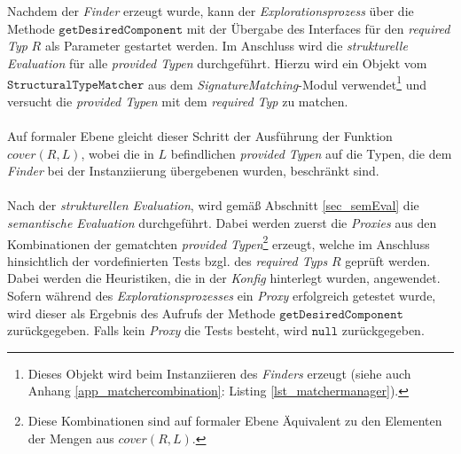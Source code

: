 \\\\
Nachdem der \emph{Finder} erzeugt wurde, kann der \emph{Explorationsprozess} über die Methode \linebreak$\texttt{getDesiredComponent}$ mit der Übergabe des \Gls{Interface}s für den \emph{required Typ} $R$ als Parameter gestartet werden. Im Anschluss wird die \emph{strukturelle Evaluation} für alle \emph{provided Typen}  durchgeführt. Hierzu wird ein Objekt vom $\texttt{StructuralTypeMatcher}$ aus dem \emph{SignatureMatching}-\Gls{Modul} verwendet\footnote{Dieses Objekt wird beim Instanziieren des \emph{Finders} erzeugt (siehe auch Anhang \ref{app_matchercombination}: Listing \ref{lst_matchermanager}).} und versucht die \emph{provided Typen} mit dem \emph{required Typ} zu matchen.
\\\\
Auf formaler Ebene gleicht dieser Schritt der Ausführung der Funktion $\mathit{cover(R,L)}$, wobei die in $L$ befindlichen \emph{provided Typen} auf die Typen, die dem \emph{Finder} bei der Instanziierung übergebenen wurden, beschränkt sind.
\\\\
Nach der \emph{strukturellen Evaluation}, wird gemäß Abschnitt \ref{sec_semEval} die \emph{semantische Evaluation} durchgeführt. Dabei werden zuerst die \emph{Proxies} aus den Kombinationen der gematchten \emph{provided Typen}\footnote{Diese Kombinationen sind auf formaler Ebene Äquivalent zu den Elementen der Mengen aus $\mathit{cover(R,L)}$.} erzeugt, welche im Anschluss hinsichtlich der vordefinierten Tests bzgl. des \emph{required Typs} $R$ geprüft werden. Dabei werden die \Gls{Heuristik}en, die in der \emph{Konfig} hinterlegt wurden, angewendet. Sofern während des \emph{Explorationsprozesses} ein \emph{Proxy} erfolgreich getestet wurde, wird dieser als Ergebnis des Aufrufs der Methode $\texttt{getDesiredComponent}$ zurückgegeben. Falls kein \emph{Proxy} die Tests besteht, wird $\texttt{null}$ zurückgegeben.
